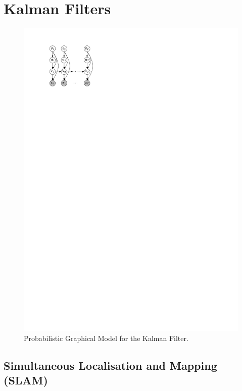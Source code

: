 \section{Kalman Filters}
\begin{figure}[!htb]
\centering
\includegraphics[scale=1]{models/kf/figures/kf}
\caption{Probabilistic Graphical Model for the Kalman Filter.}
\label{fig:models/kf/figures/kf}
\end{figure}






\subsection{Simultaneous Localisation and Mapping (SLAM)}